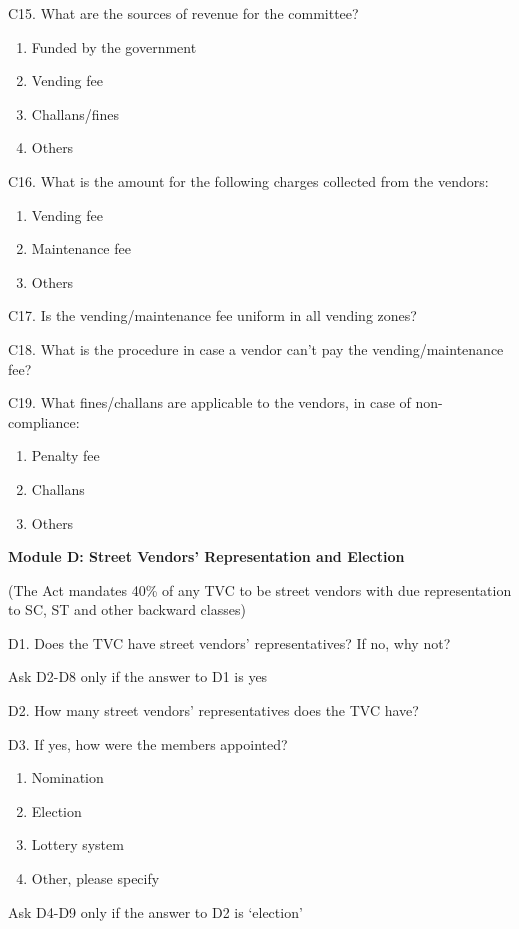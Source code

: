 \documentclass[a4paper, 12pt, twoside]{article}
\begin{document}
{{\begin{mdframed}[backgroundcolor=gray!20]
C15. What are the sources of revenue for the committee?
\begin{enumerate}[nosep]
\item Funded by the government
\item Vending fee
\item Challans/fines
\item Others
\end{enumerate}


C16. What is the amount for the following charges collected from the vendors:
\begin{enumerate}[nosep]
\item Vending fee
\item Maintenance fee
\item Others
\end{enumerate}


C17. Is the vending/maintenance fee uniform in all vending zones?


C18. What is the procedure in case a vendor can’t pay the vending/maintenance fee?


C19. What fines/challans are applicable to the vendors, in case of non-compliance:
\begin{enumerate}[nosep]
\item Penalty fee
\item Challans
\item Others
\end{enumerate}

\textbf{Module D: Street Vendors’ Representation and Election}

(The Act mandates 40\% of any TVC to be street vendors with due representation to SC, ST and other backward classes)

D1. Does the TVC have street vendors’ representatives? If no, why not?

Ask D2-D8 only if the answer to D1 is yes

D2. How many street vendors’ representatives does the TVC have?

D3. If yes, how were the members appointed?
\begin{enumerate}[nosep]
\item Nomination
\item Election
\item Lottery system
\item Other, please specify
\end{enumerate}

Ask D4-D9 only if the answer to D2 is ‘election’


\end{mdframed}}}
\end{document}
